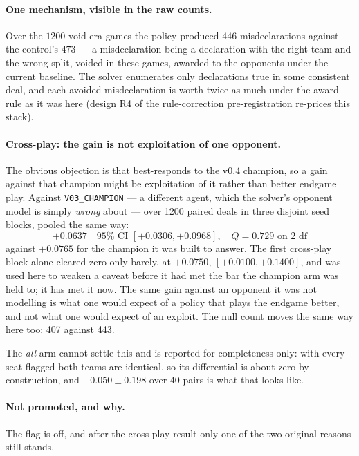\documentclass[11pt,a4paper]{article}
\begin{document}
\paragraph{One mechanism, visible in the raw counts.} Over the $1200$
void-era games the policy produced $446$ misdeclarations against the
control's $473$ --- a misdeclaration being a declaration with the right team
and the wrong split, voided in these games, awarded to the opponents under
the current baseline. The solver enumerates only declarations true in some
consistent deal, and each avoided misdeclaration is worth twice as much
under the award rule as it was here (design R4 of the rule-correction
pre-registration re-prices this stack).

\paragraph{Cross-play: the gain is not exploitation of one opponent.} The
obvious objection is that  best-responds to the v0.4
champion, so a gain against that champion might be exploitation of it rather
than better endgame play. Against \texttt{V03\_CHAMPION} --- a different agent,
which the solver's opponent model is simply \emph{wrong} about --- over
1200 paired deals in three disjoint seed
blocks, pooled the same way:
\[
  +0.0637 \quad 95\%\text{ CI } [+0.0306, +0.0968], \quad Q = 0.729 \text{ on } 2 \text{ df}
\]
against $+0.0765$ for the champion it was built to answer. The first
cross-play block alone cleared zero only barely, at
$+0.0750$, $[+0.0100, +0.1400]$, and was used here to weaken a caveat before it
had met the bar the champion arm was held to; it has met it now. The same gain
against an opponent it was not modelling is what one would expect of a policy
that plays the endgame better, and not what one would expect of an exploit. The
null count moves the same way here too: 407 against 443.

The \emph{all} arm cannot settle this and is reported for completeness only:
with every seat flagged both teams are identical, so its differential is about
zero by construction, and $-0.050 \pm 0.198$ over $40$ pairs is what that looks
like.

\paragraph{Not promoted, and why.} The flag is off, and after the cross-play
result only one of the two original reasons still stands.
\end{document}
